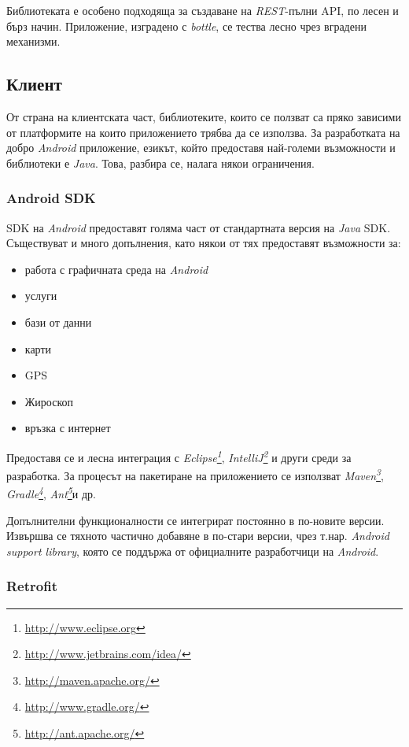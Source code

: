 		Библиотеката е особено подходяща за създаване на \emph{REST}-пълни \ac{API}, по лесен и бърз начин. Приложение, изградено с \emph{bottle}, се тества лесно чрез вградени механизми.
		
	\subsection{Клиент}
		
		От страна на клиентската част, библиотеките, които се ползват са пряко зависими от платформите на които приложението трябва да се използва.	
		За разработката на добро \emph{Android} приложение, езикът, който предоставя най-големи възможности и библиотеки е \emph{Java}. Това, разбира се, налага някои ограничения.
		
		\subsubsection{Android SDK}

		\ac{SDK} на \emph{Android} предоставят голяма част от стандартната версия на \emph{Java} \ac{SDK}. Съществуват и много допълнения, като някои от тях предоставят възможности за:
		
		\begin{itemize}
			\item работа с графичната среда на \emph{Android}
			\item услуги
			\item бази от данни
			\item карти
			\item GPS
			\item Жироскоп
			\item връзка с интернет
		\end{itemize}
		
		Предоставя се и лесна интеграция с \emph{Eclipse\footnote{\url{http://www.eclipse.org}}}, \emph{IntelliJ\footnote{\url{http://www.jetbrains.com/idea/}}} и други среди за разработка. За процесът на пакетиране на приложението се използват \emph{Maven\footnote{\url{http://maven.apache.org/}}}, \emph{Gradle\footnote{\url{http://www.gradle.org/}}}, \emph{Ant\footnote{\url{http://ant.apache.org/}}}и др.
		
		Допълнителни функционалности се интегрират постоянно в по-новите версии. Извършва се тяхното частично добавяне в по-стари версии, чрез т.нар. \emph{Android support library}, която се поддържа от официалните разработчици на \emph{Android}.
		
		\subsubsection{Retrofit}
		
